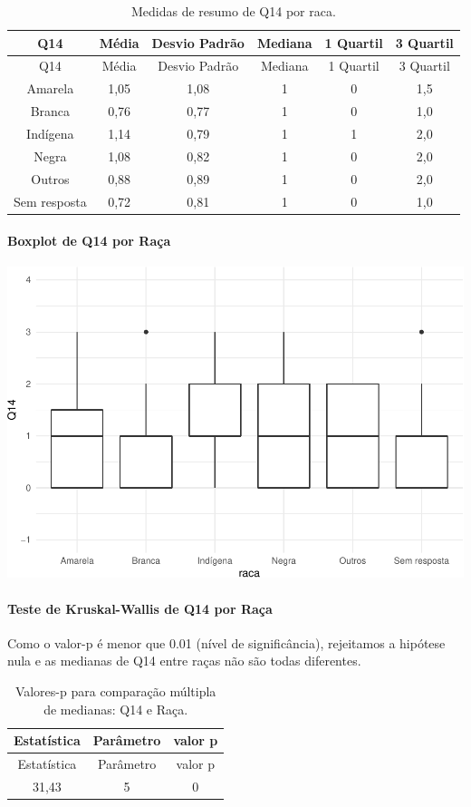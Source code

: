 \documentclass[]{article}
\let\oldparagraph\paragraph
\renewcommand{\paragraph}[1]{\oldparagraph{#1}\mbox{}}
\begin{document}
\begin{longtable}[]{@{}cccccc@{}}
\caption{\label{tab:unnamed-chunk-46}Medidas de resumo de Q14 por raca.}\tabularnewline
\toprule
Q14 & Média & Desvio Padrão & Mediana & 1 Quartil & 3 Quartil\tabularnewline
\midrule
\endfirsthead
\toprule
Q14 & Média & Desvio Padrão & Mediana & 1 Quartil & 3 Quartil\tabularnewline
\midrule
\endhead
Amarela & 1,05 & 1,08 & 1 & 0 & 1,5\tabularnewline
Branca & 0,76 & 0,77 & 1 & 0 & 1,0\tabularnewline
Indígena & 1,14 & 0,79 & 1 & 1 & 2,0\tabularnewline
Negra & 1,08 & 0,82 & 1 & 0 & 2,0\tabularnewline
Outros & 0,88 & 0,89 & 1 & 0 & 2,0\tabularnewline
Sem resposta & 0,72 & 0,81 & 1 & 0 & 1,0\tabularnewline
\bottomrule
\end{longtable}

\hypertarget{boxplot-de-q14-por-rauxe7a}{%
\paragraph{Boxplot de Q14 por Raça}\label{boxplot-de-q14-por-rauxe7a}}

\begin{center}\includegraphics[width=0.75\linewidth]{relatorio_teste_files/figure-latex/unnamed-chunk-47-1} \end{center}

\hypertarget{teste-de-kruskal-wallis-de-q14-por-rauxe7a}{%
\paragraph{Teste de Kruskal-Wallis de Q14 por Raça}\label{teste-de-kruskal-wallis-de-q14-por-rauxe7a}}

Como o valor-p é menor que 0.01 (nível de significância), rejeitamos a hipótese nula e as medianas de Q14 entre raças não são todas diferentes.

\begin{longtable}[]{@{}ccc@{}}
\caption{\label{tab:unnamed-chunk-49}Valores-p para comparação múltipla de medianas: Q14 e Raça.}\tabularnewline
\toprule
Estatística & Parâmetro & valor p\tabularnewline
\midrule
\endfirsthead
\toprule
Estatística & Parâmetro & valor p\tabularnewline
\midrule
\endhead
31,43 & 5 & 0\tabularnewline
\bottomrule
\end{longtable}
\end{document}
